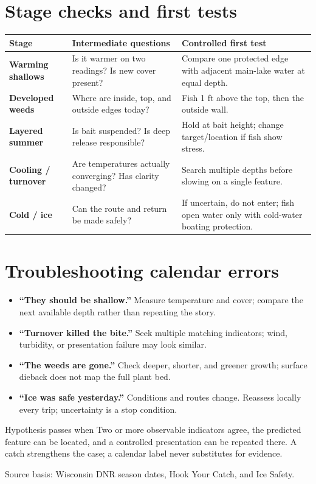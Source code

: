 \section{Stage checks and first tests}
\begin{tabularx}{\linewidth}{@{}>{\bfseries}p{.2\linewidth}p{.35\linewidth}X@{}}
\toprule Stage&Intermediate questions&Controlled first test\\\midrule
Warming shallows&Is it warmer on two readings? Is new cover present?&Compare
one protected edge with adjacent main-lake water at equal depth.\\
Developed weeds&Where are inside, top, and outside edges today?&Fish 1 ft above
the top, then the outside wall.\\
Layered summer&Is bait suspended? Is deep release responsible?&Hold at bait
height; change target/location if fish show stress.\\
Cooling / turnover&Are temperatures actually converging? Has clarity changed?&
Search multiple depths before slowing on a single feature.\\
Cold / ice&Can the route and return be made safely?&If uncertain, do not enter;
fish open water only with cold-water boating protection.\\
\bottomrule
\end{tabularx}

\section{Troubleshooting calendar errors}
\begin{itemize}
\item \textbf{“They should be shallow.”} Measure temperature and cover; compare
the next available depth rather than repeating the story.
\item \textbf{“Turnover killed the bite.”} Seek multiple matching indicators;
wind, turbidity, or presentation failure may look similar.
\item \textbf{“The weeds are gone.”} Check deeper, shorter, and greener growth;
surface dieback does not map the full plant bed.
\item \textbf{“Ice was safe yesterday.”} Conditions and routes change. Reassess
locally every trip; uncertainty is a stop condition.
\end{itemize}
\begin{telospanel}{Hypothesis passes when}
Two or more observable indicators agree, the predicted feature can be located,
and a controlled presentation can be repeated there. A catch strengthens the
case; a calendar label never substitutes for evidence.
\end{telospanel}

\small Source basis: Wisconsin DNR season dates, Hook Your Catch, and Ice Safety.

